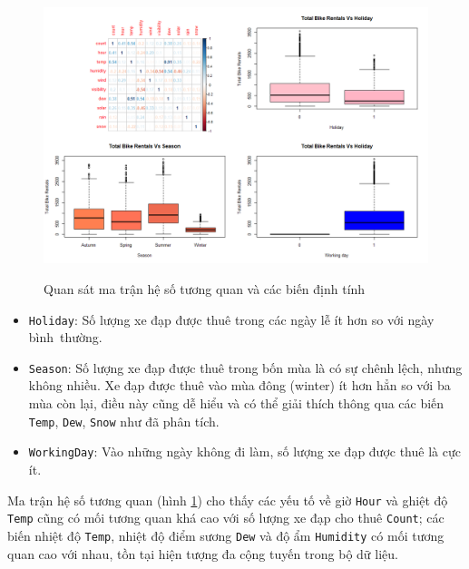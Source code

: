 \begin{figure}[H]
	\centering
	{\includegraphics[width=\linewidth]{../Photo Of Result/A2_corr}}	
	\caption{Quan sát ma trận hệ số tương quan và các biến định tính}
	\label{A2_visual2}
\end{figure}

\begin{itemize}
	\item \texttt{Holiday}: Số lượng xe đạp được thuê trong các ngày lễ ít hơn so với ngày bình~thường.
	\item \texttt{Season}: Số lượng xe đạp được thuê trong bốn mùa là có sự chênh lệch, nhưng không nhiều. Xe đạp được thuê vào mùa đông (winter) ít hơn hẳn so với ba mùa còn lại, điều này cũng dễ hiểu và có thể giải thích thông qua các biến \texttt{Temp}, \texttt{Dew}, \texttt{Snow} như đã phân tích.
	\item \texttt{WorkingDay}: Vào những ngày không đi làm, số lượng xe đạp được thuê là cực ít.
\end{itemize}

Ma trận hệ số tương quan (hình \ref{A2_visual2}) cho thấy các yếu tố về giờ \texttt{Hour} và ghiệt độ \texttt{Temp} cũng có mối tương quan khá cao với số lượng xe đạp cho thuê \texttt{Count}; các biến nhiệt độ \texttt{Temp}, nhiệt độ điểm sương \texttt{Dew} và độ ẩm \texttt{Humidity} có mối tương quan cao với nhau, tồn tại hiện tượng đa cộng tuyến trong bộ dữ liệu. 

